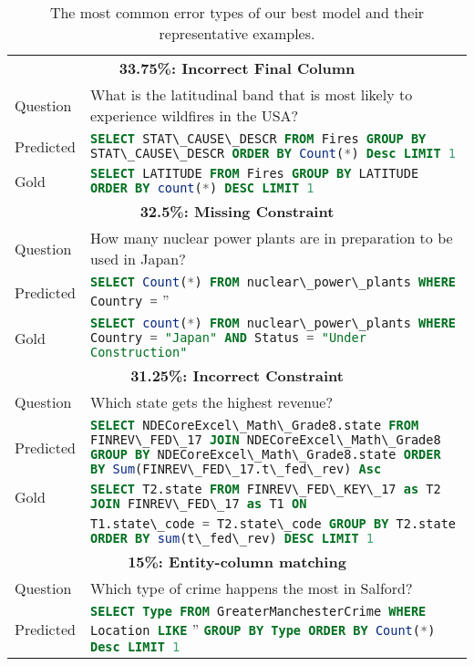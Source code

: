 \documentclass[11pt,a4paper]{article}
\newcommand{\sql}[1]{\lstinline[language=SQL, basicstyle=\footnotesize\ttfamily]{#1}}
\begin{document}
\begin{table*}[t]
    \small
    \centering
    \caption{The most common error types of our best model and their representative examples.}
    \label{tab:error_example}
\begin{tabular}{lp{14.2cm}}
        \toprule
        \multicolumn{2}{c}{\bfseries 33.75\%:  Incorrect Final Column} \\
        Question  &  What is the latitudinal band that is most likely to experience wildfires in the USA?\\
        Predicted &  \sql{SELECT STAT\_CAUSE\_DESCR FROM Fires GROUP BY STAT\_CAUSE\_DESCR ORDER BY Count(*) Desc LIMIT 1}\\
        Gold & \sql{SELECT LATITUDE FROM Fires GROUP BY LATITUDE ORDER BY count(*) DESC LIMIT 1} \\
        \midrule
        \multicolumn{2}{c}{\bfseries 32.5\%:  Missing Constraint} \\
        Question  &  How many nuclear power plants are in preparation to be used in Japan? \\
        Predicted & \sql{SELECT Count(*) FROM nuclear\_power\_plants WHERE Country =} '' \\
        Gold & \sql{SELECT count(*) FROM nuclear\_power\_plants WHERE Country = "Japan" AND Status = "Under Construction"} \\
        \midrule
        \multicolumn{2}{c}{\bfseries 31.25\%:  Incorrect Constraint} \\
        Question  &  Which state gets the highest revenue?\\
        Predicted &  \sql{SELECT NDECoreExcel\_Math\_Grade8.state FROM FINREV\_FED\_17 JOIN NDECoreExcel\_Math\_Grade8 GROUP BY NDECoreExcel\_Math\_Grade8.state ORDER BY Sum(FINREV\_FED\_17.t\_fed\_rev) Asc}\\
        Gold &   \sql{SELECT T2.state FROM FINREV\_FED\_KEY\_17 as T2 JOIN FINREV\_FED\_17 as T1 ON} \\ & \sql{T1.state\_code = T2.state\_code GROUP BY T2.state ORDER BY sum(t\_fed\_rev) DESC LIMIT 1}\\
        \midrule
        \multicolumn{2}{c}{\bfseries 15\%:  Entity-column matching} \\
        Question  & Which type of crime happens the most in Salford? \\
        Predicted &  \sql{SELECT Type FROM GreaterManchesterCrime WHERE Location LIKE} '' \sql{GROUP BY Type ORDER BY Count(*) Desc LIMIT 1}\\

\end{tabular}
\end{table*}
\end{document}
